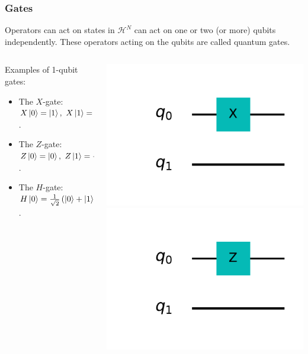 \documentclass{beamer}
\newcommand{\mc}{\mathcal}
\renewcommand{\(}{\left(}
\renewcommand{\)}{\right)}
\renewcommand{\[}{\left[}
\renewcommand{\]}{\right]}
\begin{document}
\begin{frame}
    \frametitle{Gates}
    Operators can act on states in $\mc H^N$ can act on  one or two (or more) qubits independently. These operators acting on the qubits are called quantum gates.
    \vspace{10pt}
    \begin{columns}
        \begin{column}[]{0.8\textwidth}
            Examples of 1-qubit gates: 
            \begin{itemize}
                \item The $X$-gate: $X\ket{0} = \ket{1}, \ X\ket{1} = \ket{0}$. 
                \item The $Z$-gate: $Z\ket{0} = \ket{0}, \ Z\ket{1} = -\ket{1}$.
                \item The $H$-gate: $H\ket{0} = \frac{1}{\sqrt{2}} \(\ket{0}  + \ket{1}\),\ H\ket{1}  = \frac{1}{\sqrt{2}} \(\ket{0} - \ket{1}\)$.       
            \end{itemize}
        \end{column}
        \begin{column}[]{0.2\textwidth}
            \centering
            \includegraphics[scale=0.5, trim = 100 65 40 30, clip]{x_qubit_1.pdf} 
            \includegraphics[scale=0.5, trim = 100 65 40 35, clip]{z_qubit_1.pdf} 

\end{column}
\end{columns}
\end{frame}
\end{document}
